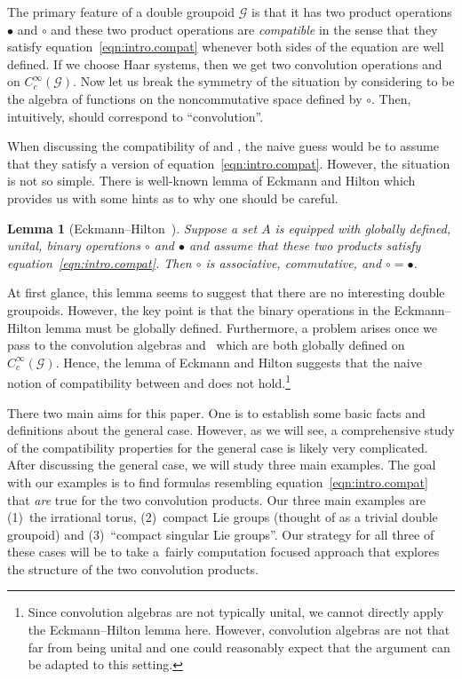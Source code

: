 \documentclass[pdftex]{sigma}
\numberwithin{equation}{section}
\newtheorem{Lemma}[Theorem]{Lemma}
\theoremstyle{definition}
\newcommand{\CG}{\mathcal{G}}
\newcommand{\stardot}{\overset{{\bullet}}{*}}
\newcommand{\starcirc}{\overset{\circ}{*}}
\begin{document}
The primary feature of a double groupoid $ \CG $ is that it has two product operations $ \bullet $ and $ \circ $ and these two product operations are \emph{compatible} in the sense that they satisfy equation~\eqref{eqn:intro.compat} whenever both sides of the equation are well defined.
If we choose Haar systems, then we get two convolution operations \smash{$ \starcirc $} and \smash{$ \stardot $} on $ C_c^\infty(\CG) $. Now let us break the symmetry of the situation by considering \smash{$ \starcirc$} to be the algebra of functions on the noncommutative space defined by $ \circ $. Then, intuitively, \smash{$ \stardot$} should correspond to ``convolution''.

When discussing the compatibility of \smash{$ \starcirc $} and \smash{$ \stardot $}, the naive guess would be to assume that they satisfy a version of equation~\eqref{eqn:intro.compat}. However, the situation is not so simple. There is well-known lemma of Eckmann and Hilton which provides us with some hints as to why one should be careful.
\begin{Lemma}[Eckmann--Hilton~\cite{EckmannHilton}]
   Suppose a set $ A $ is equipped with globally defined, unital, binary operations $ \circ $ and $ \bullet $ and assume that these two products satisfy equation~\eqref{eqn:intro.compat}. Then $ \circ $ is associative, commutative, and $ \circ = \bullet $.
\end{Lemma}
At first glance, this lemma seems to suggest that there are no interesting double groupoids. However, the key point is that the binary operations in the Eckmann--Hilton lemma must be globally defined. Furthermore, a problem arises once we pass to the convolution algebras \smash{$ \stardot$} and~\smash{$ \starcirc$} which are both globally defined on $ C_c^\infty(\CG) $. Hence, the lemma of Eckmann and Hilton suggests that the naive notion of compatibility between \smash{$ \starcirc$} and \smash{$ \stardot$} does not hold.\footnote{Since convolution algebras are not typically unital, we cannot directly apply the Eckmann--Hilton lemma here. However, convolution algebras are not that far from being unital and one could reasonably expect that the argument can be adapted to this setting.}

There two main aims for this paper. One is to establish some basic facts and definitions about the general case. However, as we will see, a comprehensive study of the compatibility properties for the general case is likely very complicated. After discussing the general case, we will study three main examples. The goal with our examples is to find formulas resembling equation~\eqref{eqn:intro.compat} that \emph{are} true for the two convolution products. Our three main examples are (1)~the irrational torus, (2)~compact Lie groups (thought of as a trivial double groupoid) and (3)~``compact singular Lie groups''. Our strategy for all three of these cases will be to take a~fairly computation focused approach that explores the structure of the two convolution products.
\end{document}
